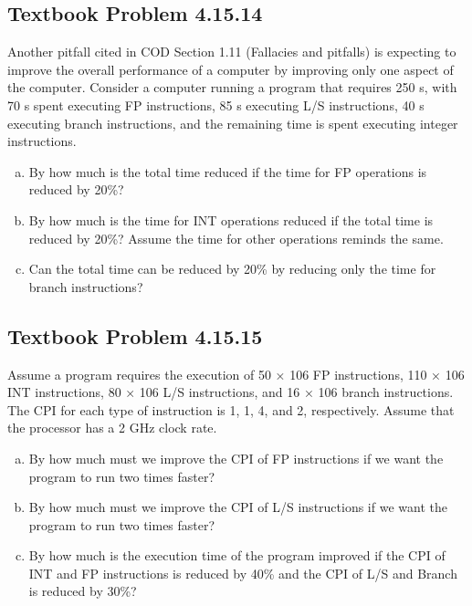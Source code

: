 \documentclass[12pt]{article}
\begin{document}
\subsection{Textbook Problem 4.15.14}
Another pitfall cited in COD Section 1.11 (Fallacies and pitfalls) is expecting to improve the overall performance of a computer by improving only one aspect of the computer. Consider a computer running a program that requires 250 s, with 70 s spent executing FP instructions, 85 s executing L/S instructions, 40 s executing branch instructions, and the remaining time is spent executing integer instructions.
\begin{enumerate}[(a)]
    \item By how much is the total time reduced if the time for FP operations is reduced by 20\%?
    \item By how much is the time for INT operations reduced if the total time is reduced by 20\%? Assume the time for other operations reminds the same.
    \item Can the total time can be reduced by 20\% by reducing only the time for branch instructions?

\end{enumerate}


\subsection{Textbook Problem 4.15.15}
Assume a program requires the execution of 50 × 106 FP instructions, 110 × 106 INT instructions, 80 × 106 L/S instructions, and 16 × 106 branch instructions. The CPI for each type of instruction is 1, 1, 4, and 2, respectively. Assume that the processor has a 2 GHz clock rate.
\begin{enumerate}[(a)]
    \item By how much must we improve the CPI of FP instructions if we want the program to run two times faster?
    \item By how much must we improve the CPI of L/S instructions if we want the program to run two times faster?
    \item By how much is the execution time of the program improved if the CPI of INT and FP instructions is reduced by 40\% and the CPI of L/S and Branch is reduced by 30\%?

\end{enumerate}


\end{document}
